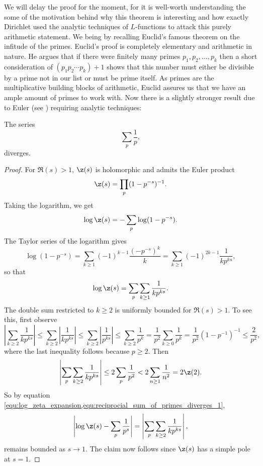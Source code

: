       We will delay the proof for the moment, for it is well-worth understanding the some of the motivation behind why this theorem is interesting and how exactly Dirichlet used the analytic techniques of $L$-functions to attack this purely arithmetic statement. We being by recalling Euclid's famous theorem on the infitude of the primes. Euclid's proof is completely elementary and arithmetic in nature. He argues that if there were finitely many primes $p_{1},p_{2},\ldots,p_{k}$ then a short consideration of $(p_{1}p_{2} \cdots p_{k})+1$ shows that this number must either be divisible by a prime not in our list or must be prime itself. As primes are the multiplicative building blocks of arithmetic, Euclid assures us that we have an ample amount of primes to work with. Now there is a slightly stronger result due to Euler (see \cite{euler1744variae}) requiring analytic techniques:

      \begin{theorem}\label{thm:reciprocial_sum_of_primes_diverges}
        The series
        \[
          \sum_{p}\frac{1}{p},
        \]
        diverges.
      \end{theorem}
      \begin{proof}
        For $\Re(s) > 1$, $\z(s)$ is holomorphic and admits the Euler product
        \[
          \z(s) = \prod_{p}(1-p^{-s})^{-1}.
        \]
        Taking the logarithm, we get
        \[
          \log\z(s) = -\sum_{p}\log(1-p^{-s}).
        \]
        The Taylor series of the logarithm gives
        \[
          \log(1-p^{-s}) = \sum_{k \ge 1}(-1)^{k-1}\frac{(-p^{-s})^{k}}{k} = \sum_{k \ge 1}(-1)^{2k-1}\frac{1}{kp^{ks}},
        \]
        so that
        \begin{equation}\label{equ:log_zeta_expansion}
          \log\z(s) = \sum_{p}\sum_{k \ge 1}\frac{1}{kp^{ks}}.
        \end{equation}
        The double sum restricted to $k \ge 2$ is uniformly bounded for $\Re(s) > 1$. To see this, first observe
        \[
          \left|\sum_{k \ge 2}\frac{1}{kp^{ks}}\right| \le \sum_{k \ge 2}\left|\frac{1}{kp^{ks}}\right| \le \sum_{k \ge 2}\left|\frac{1}{p^{ks}}\right| \le \sum_{k \ge 2}\frac{1}{p^{k}} = \frac{1}{p^{2}}\sum_{k \ge 0}\frac{1}{p^{k}} = \frac{1}{p^{2}}(1-p^{-1})^{-1} \le \frac{2}{p^{2}},
        \]
        where the last inequality follows because $p \ge 2$. Then
        \begin{equation}\label{equ:reciprocial_sum_of_primes_diverges_1}
          \left|\sum_{p}\sum_{k \ge 2}\frac{1}{kp^{ks}}\right| \le 2\sum_{p}\frac{1}{p^{2}} < 2\sum_{n \ge 1}\frac{1}{n^{2}} = 2\z(2).
        \end{equation}
        So by equation \cref{equ:log_zeta_expansion,equ:reciprocial_sum_of_primes_diverges_1},
        \[
          \left|\log\z(s)-\sum_{p}\frac{1}{p^{s}}\right| = \left|\sum_{p}\sum_{k \ge 2}\frac{1}{kp^{ks}}\right|,
        \]
        remains bounded as $s \to 1$. The claim now follows since $\z(s)$ has a simple pole at $s = 1$.
      \end{proof}

